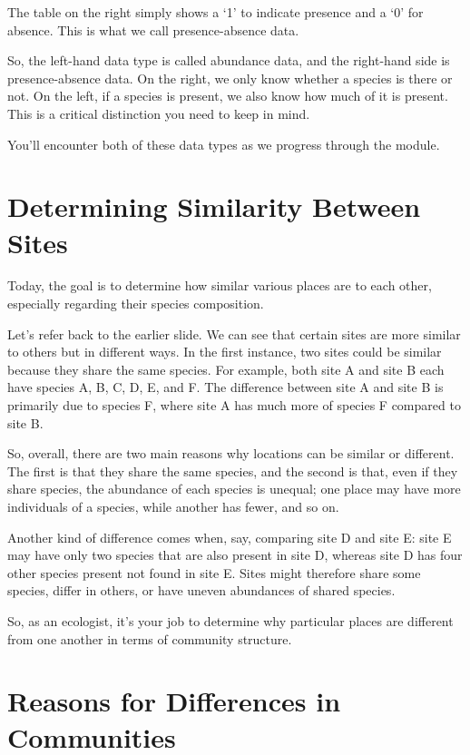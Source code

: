 \documentclass[
  10pt,
]{book}
\begin{document}
The table on the right simply shows a `1' to indicate presence and a `0'
for absence. This is what we call presence-absence data.

So, the left-hand data type is called abundance data, and the right-hand
side is presence-absence data. On the right, we only know whether a
species is there or not. On the left, if a species is present, we also
know how much of it is present. This is a critical distinction you need
to keep in mind.

You'll encounter both of these data types as we progress through the
module.

\section{Determining Similarity Between
Sites}\label{determining-similarity-between-sites}

Today, the goal is to determine how similar various places are to each
other, especially regarding their species composition.

Let's refer back to the earlier slide. We can see that certain sites are
more similar to others but in different ways. In the first instance, two
sites could be similar because they share the same species. For example,
both site A and site B each have species A, B, C, D, E, and F. The
difference between site A and site B is primarily due to species F,
where site A has much more of species F compared to site B.

So, overall, there are two main reasons why locations can be similar or
different. The first is that they share the same species, and the second
is that, even if they share species, the abundance of each species is
unequal; one place may have more individuals of a species, while another
has fewer, and so on.

Another kind of difference comes when, say, comparing site D and site E:
site E may have only two species that are also present in site D,
whereas site D has four other species present not found in site E. Sites
might therefore share some species, differ in others, or have uneven
abundances of shared species.

So, as an ecologist, it's your job to determine why particular places
are different from one another in terms of community structure.

\section{Reasons for Differences in
Communities}\label{reasons-for-differences-in-communities}
\end{document}
